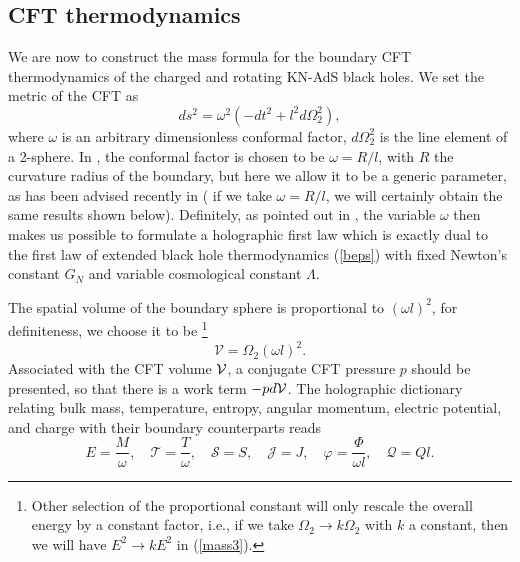 \documentclass[a4paper,11pt]{article}
\newcommand{\eq}[1]{(\ref{#1})}
\begin{document}
\subsection{CFT thermodynamics}

We are now to construct the mass formula for the boundary CFT thermodynamics of the charged and rotating KN-AdS black holes. We set the metric of the CFT as \cite{Gubser:1998bc,Witten:1998qj,Ahmed:2023snm}
\begin{equation}
d s^2=\omega^2 \left(-d t^2+l^2 d \Omega_{2}^2\right),
\end{equation}
where $\omega$ is an arbitrary dimensionless conformal factor, $d \Omega_{2}^2$ is the line element of a 2-sphere. In 
\cite{Visser:2021eqk,Cong:2021jgb}, the conformal factor is chosen to be $\omega=R/l$, with $R$ the curvature radius of the boundary, but here we allow it to be a generic parameter, as has been advised recently in \cite{Ahmed:2023snm} ( if we take $\omega=R/l$, we will certainly obtain the same results shown below). Definitely, as pointed out in \cite{Ahmed:2023snm}, the variable $\omega$ then makes us possible to formulate a holographic first law which is exactly dual to the first law of extended black hole thermodynamics \eq{beps} with fixed Newton's constant $G_N$ and variable cosmological constant $\Lambda$.

The spatial volume of the boundary sphere is proportional to $(\omega l)^2$, for definiteness, we choose it to be \footnote{Other selection of the proportional constant will only rescale the overall energy by a constant factor, i.e., if we take $\Omega_2\to k\Omega_2$ with $k$ a constant, then we will have $E^2\to kE^2$ in \eq{mass3}.}
\begin{equation}\label{voml}
\mathcal{V}=\Omega_{2} (\omega l)^{2}.
\end{equation}
Associated with the CFT volume $\mathcal{V}$, a conjugate CFT pressure $p$ should be presented, so that there is a work term $-pd\mathcal{V}$. The holographic dictionary relating bulk mass, temperature, entropy, angular momentum, electric potential, and charge with their boundary counterparts reads \cite{Chamblin:1999tk,Savonije:2001nd,Visser:2021eqk}
\begin{equation}
E=\frac{M}{\omega},\quad  \mathcal{T}=\frac{T}{\omega},\quad \mathcal{S}=S,\quad \mathcal{J}=J,\quad \varphi=\frac{\Phi}{\omega l}, \quad \mathcal{Q}=Q l.
\end{equation}
\end{document}
